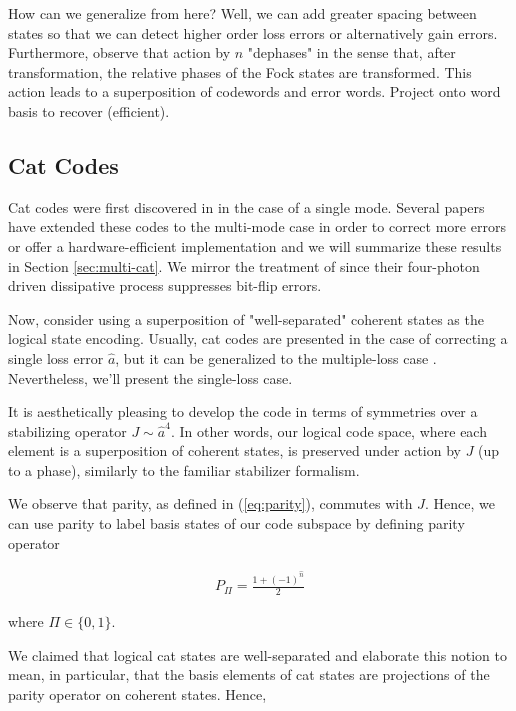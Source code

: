 \documentclass[12]{amsart}
\newcommand\0{\mathbf{0}}
\newcommand\<{\langle}
\renewcommand\>{\rangle}
\begin{document}
How can we generalize from here? Well, we can add greater spacing between states so that we can detect higher order loss errors or alternatively gain errors. Furthermore, observe that action by $n$ "dephases" in the sense that, after transformation, the relative phases of the Fock states are transformed. This action leads to a superposition of codewords and error words. Project onto word basis to recover (efficient).

\subsection{Cat Codes}

Cat codes were first discovered in \cite{cochrane1999macroscopically} in the case of a single mode. Several papers have extended these codes to the multi-mode case in order to correct more errors or offer a hardware-efficient implementation \cite{albert2018multimode, leghtas2013hardware, mirrahimi2014dynamically} and we will summarize these results in Section \ref{sec:multi-cat}. We mirror the treatment of \cite{mirrahimi2014dynamically} since their four-photon driven dissipative process suppresses bit-flip errors.

Now, consider using a superposition of "well-separated" coherent states as the logical state encoding. Usually, cat codes are presented in the case of correcting a single loss error $\hat{a}$, but it can be generalized to the multiple-loss case \cite{albert2018multimode}. Nevertheless, we'll present the single-loss case.

It is aesthetically pleasing to develop the code in terms of symmetries over a stabilizing operator $J \sim \hat{a}^4$. In other words, our logical code space, where each element is a superposition of coherent states, is preserved under action by $J$ (up to a phase), similarly to the familiar stabilizer formalism.

We observe that parity, as defined in (\ref{eq:parity}), commutes with $J$. Hence, we can use parity to label basis states of our code subspace by defining parity operator

\begin{align*}
P_{\Pi} = \frac{1+(-1)^{\hat{n}}}{2}	
\end{align*}

where $\Pi \in \{0, 1\}$.

We claimed that logical cat states are well-separated and elaborate this notion to mean, in particular, that the basis elements of cat states are projections of the parity operator on coherent states. Hence,
\end{document}
